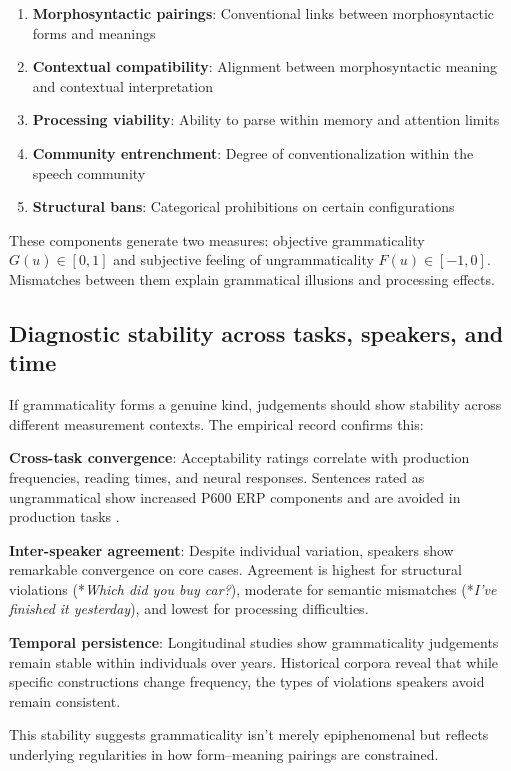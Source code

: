 \documentclass[12pt]{article}
\begin{document}
\begin{enumerate}
\item \textbf{Morphosyntactic pairings}: Conventional links between morphosyntactic forms and meanings
\item \textbf{Contextual compatibility}: Alignment between morphosyntactic meaning and contextual interpretation  
\item \textbf{Processing viability}: Ability to parse within memory and attention limits
\item \textbf{Community entrenchment}: Degree of conventionalization within the speech community
\item \textbf{Structural bans}: Categorical prohibitions on certain configurations
\end{enumerate}
These components generate two measures: objective grammaticality $G(u)\in[0,1]$ and subjective feeling of ungrammaticality $F(u)\in[-1,0]$. Mismatches between them explain grammatical illusions and processing effects.

\subsection{Diagnostic stability across tasks, speakers, and time}

If grammaticality forms a genuine kind, judgements should show stability across different measurement contexts. The empirical record confirms this:

\textbf{Cross-task convergence}: Acceptability ratings correlate with production frequencies, reading times, and neural responses. Sentences rated as ungrammatical show increased P600 ERP components and are avoided in production tasks \parencite{schutze2016}.

\textbf{Inter-speaker agreement}: Despite individual variation, speakers show remarkable convergence on core cases. Agreement is highest for structural violations (*\textit{Which did you buy car?}), moderate for semantic mismatches (*\textit{I've finished it yesterday}), and lowest for processing difficulties.

\textbf{Temporal persistence}: Longitudinal studies show grammaticality judgements remain stable within individuals over years. Historical corpora reveal that while specific constructions change frequency, the types of violations speakers avoid remain consistent.

This stability suggests grammaticality isn't merely epiphenomenal but reflects underlying regularities in how form--meaning pairings are constrained.
\end{document}
